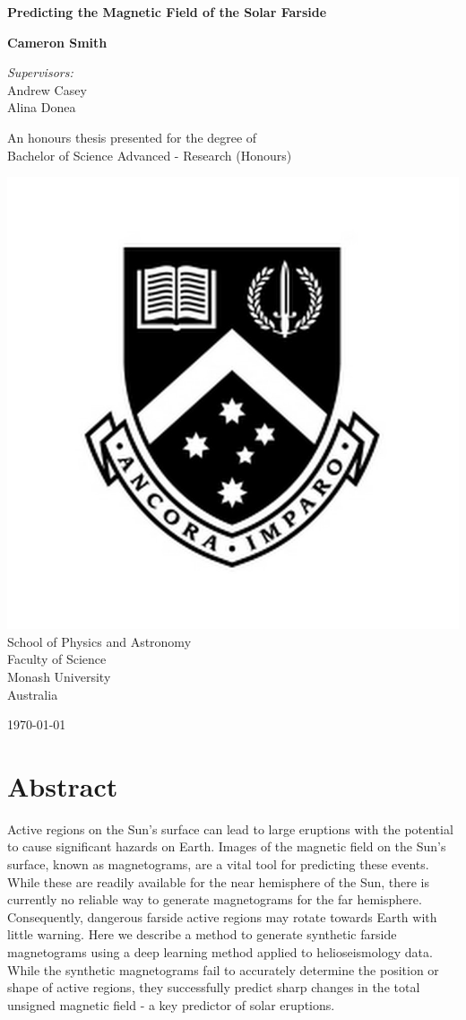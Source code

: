 \documentclass[11pt,a4paper,onecolumn]{report}
\begin{document}
\begin{titlepage}
  \begin{center}
    \vspace*{2cm}
    \Huge
    \textbf{Predicting the Magnetic Field of the Solar Farside}

    \vspace{2cm}
    \LARGE
    \textbf{Cameron Smith}

    \vspace{0.8cm}
    \Large \textit{Supervisors:}\\
    Andrew Casey\\
    Alina Donea

    \vfill
    \large
    An honours thesis presented for the degree of\\
    Bachelor of Science Advanced - Research (Honours)

    \vspace{0.3cm}
    \includegraphics[width=0.2\linewidth]{"Monash_Logo"}\\
    School of Physics and Astronomy\\
    Faculty of Science\\
    Monash University\\
    Australia

    \vspace{0.5cm}

    \today

  \end{center}
\end{titlepage}

\chapter*{Abstract}
Active regions on the Sun's surface can lead to large eruptions with the
potential to cause significant hazards on Earth. Images of the magnetic field on
the Sun's surface, known as magnetograms, are a vital tool for predicting these
events. While these are readily available for the near hemisphere of the Sun,
there is currently no reliable way to generate magnetograms for the far
hemisphere. Consequently, dangerous farside active regions may rotate towards
Earth with little warning. Here we describe a method to generate synthetic
farside magnetograms using a deep learning method applied to helioseismology
data. While the synthetic magnetograms fail to accurately determine the position
or shape of active regions, they successfully predict sharp changes in the total
unsigned magnetic field - a key predictor of solar eruptions.
\end{document}
